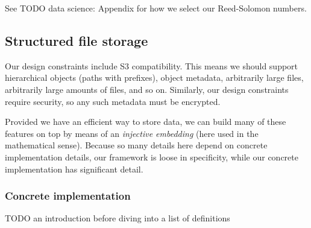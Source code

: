 \documentclass[a4paper,10pt]{article} \usepackage[utf8]{inputenc}
\newcommand{\todo}[1]{{\color{red} TODO #1 }}
\begin{document}
See \todo{data science: Appendix} for how we select our Reed-Solomon numbers.

\subsection{Structured file storage}

Our design constraints include S3 compatibility. This means we should support
hierarchical objects (paths with prefixes), object metadata, arbitrarily large
files, arbitrarily large amounts of files, and so on. Similarly, our design
constraints require security, so any such metadata must be encrypted.

Provided we have an efficient way to store data, we can build many of these
features on top by means of an {\em injective embedding} (here used in the
mathematical sense). Because so many details here depend on concrete
implementation details, our framework is loose in specificity, while our
concrete implementation has significant detail.

\subsubsection{Concrete implementation}

\todo{an introduction before diving into a list of definitions}
\end{document}
